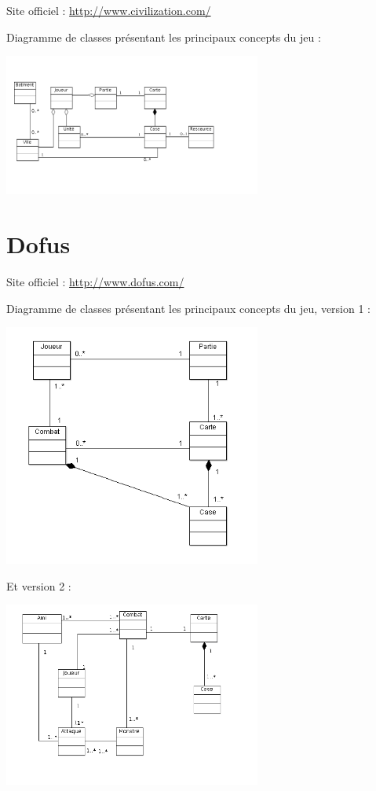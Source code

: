 \documentclass[a4paper,10pt]{report}
\begin{document}
    Site officiel : \url{http://www.civilization.com/}
    
    Diagramme de classes présentant les principaux concepts du jeu : 
    
		\includegraphics[width=320px]{diagrammes/concept_civilization.png}
    

	\section{Dofus}
	
    Site officiel : \url{http://www.dofus.com/}

    Diagramme de classes présentant les principaux concepts du jeu, version 1 : 
    
		\includegraphics[width=320px]{diagrammes/classdiagram_dofus.png}
    
    Et version 2 :
     
		\includegraphics[width=320px]{diagrammes/concept_dofus.png}
\end{document}
